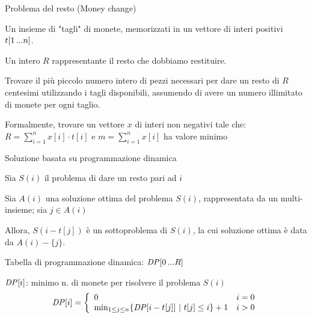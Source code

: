 \begin{frame}{Problema del resto (Money change)}

\vspace{-9pt}
\begin{myboxtitle}[Input]
\BI
\item Un insieme di "tagli" di monete, memorizzati in un vettore di interi positivi $t[1 \mydots n]$.
\item Un intero $R$ rappresentante il resto che dobbiamo restituire.
\EI
\end{myboxtitle}

\smallskip
\begin{myboxtitle}
Trovare il più piccolo numero intero di pezzi necessari per dare un resto di $R$ 
centesimi utilizzando i tagli disponibili, assumendo di avere un numero illimitato di
monete per ogni taglio.

Formalmente, trovare un vettore $x$ di interi non negativi tale che:\\
$\displaystyle
	R = \sum_{i=1}^n x[i] \cdot t[i]
$ \qquad
e \qquad $m = \sum_{i=1}^n x[i]$ ha valore minimo


\end{myboxtitle}

\end{frame}

\begin{frame}{Soluzione basata su programmazione dinamica}

\vspace{-9pt}
\begin{myboxtitle}
\BI
\item Sia $S(i)$ il problema di dare un resto pari ad $i$
\item Sia $A(i)$ una soluzione ottima del problema $S(i)$, rappresentata da un 
multi-insieme; sia $j \in A(i)$
\item Allora, $S(i-t[j])$ è un sottoproblema di
$S(i)$, la cui soluzione ottima è data da $A(i)-\{ j \}$.
\EI
\end{myboxtitle}

\begin{myboxtitle}
\BI
\item Tabella di programmazione dinamica: $\DP[0 \mydots R]$
\item $\DP[i]$: \alert{minimo n. di monete per risolvere il problema $S(i)$}
\EI
\[
\DP[i] = \left\{ 
\begin{array}{ll}
  0 & i=0 \\
  \min_{1 \leq j \leq n} \{ \DP[i-t[j]] ~|~ t[j] \leq i \} + 1 & i>0
  \end{array} 
\right.
\]
\end{myboxtitle}


\end{frame}

